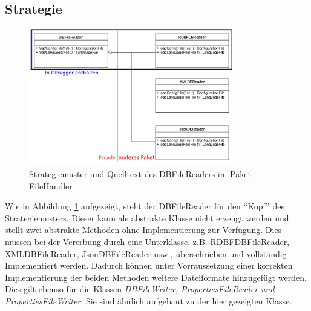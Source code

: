 \documentclass[parskip=full]{scrartcl}
\begin{document}
\subsection{Strategie}
\begin{figure}[!h]
\centering
\includegraphics[width=0.8\textwidth]{document_data/Strategy_uml_d.pdf}

\caption{Strategiemuster und Quelltext des DBFileReaders im Paket FileHandler}
\label{fig:strategy_fh}
\end{figure}
Wie in Abbildung \ref{fig:strategy_fh} aufgezeigt, steht der DBFileReader für den \enquote{Kopf} des Strategiemusters.
Dieser kann als abstrakte Klasse nicht erzeugt werden und stellt zwei abstrakte Methoden ohne Implementierung zur Verfügung.
Dies müssen bei der Vererbung durch eine Unterklasse, z.B. RDBFDBFileReader, XMLDBFileReader, JsonDBFileReader usw., überschrieben und vollständig Implementiert werden.
Dadurch können unter Vorraussetzung einer korrekten Implementierung der beiden Methoden weitere Dateiformate hinzugefügt werden.
Dies gilt ebenso für die Klassen \textit{DBFileWriter, PropertiesFileReader und PropertiesFileWriter}. Sie sind ähnlich aufgebaut zu der hier gezeigten Klasse.
\end{document}
